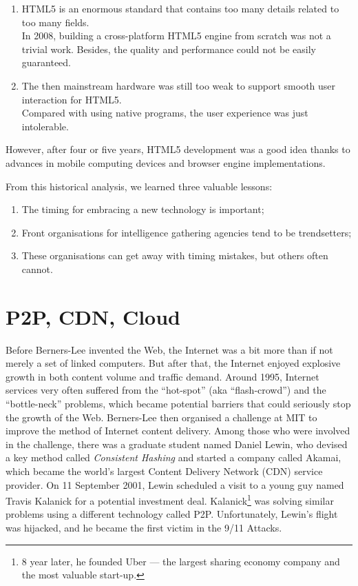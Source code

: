 \begin{enumerate}
	\item HTML5 is an enormous standard that contains too many details related to too many fields.\\
	In 2008, building a cross-platform HTML5 engine from scratch was not a trivial work. Besides, the quality and performance could not be easily guaranteed. 
	\item The then mainstream hardware was still too weak to support smooth user interaction for HTML5.\\
	Compared with using native programs, the user experience was just intolerable. 
\end{enumerate} 

However, after four or five years, HTML5 development was a good idea thanks to advances in mobile computing devices and browser engine implementations.

From this historical analysis, we learned three valuable lessons: 
\begin{enumerate}
	\item The timing for embracing a new technology is important; 
	\item Front organisations for intelligence gathering agencies tend to be trendsetters;
	\item These organisations can get away with timing mistakes, but others often cannot. 
\end{enumerate}  

\section{P2P, CDN, Cloud}
Before Berners-Lee invented the Web, the Internet was a bit more than if not merely a set of linked computers. But after that, the Internet enjoyed explosive growth in both content volume and traffic demand. Around 1995, Internet services very often suffered from the ``hot-spot'' (aka ``flash-crowd'') and the ``bottle-neck'' problems, which became potential barriers that could seriously stop the growth of the Web. Berners-Lee then organised a challenge at MIT to improve the method of Internet content delivery. Among those who were involved in the challenge, there was a graduate student named Daniel Lewin, who devised a key method called \emph{Consistent Hashing} \cite{Karger:1997:Consistent} and started a company called Akamai, which became the world's largest Content Delivery Network (CDN) service provider. On 11 September 2001, Lewin scheduled a visit to a young guy named Travis Kalanick for a potential investment deal. Kalanick\footnote{8 year later, he founded Uber --- the largest sharing economy company and the most valuable start-up.} was solving similar problems using a different technology called P2P. Unfortunately, Lewin's flight was hijacked, and he became the first victim in the 9/11 Attacks. 

